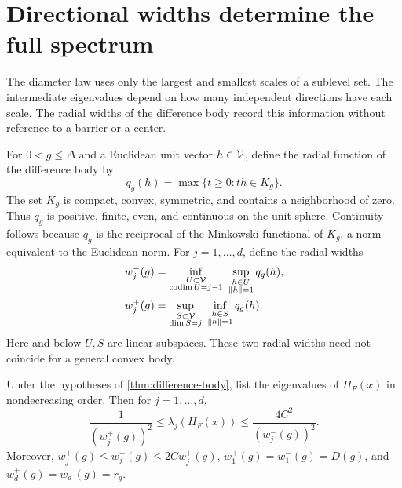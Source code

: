 \section{Directional widths determine the full spectrum}
\label{sec:widths}

The diameter law uses only the largest and smallest scales of a
sublevel set. The intermediate eigenvalues depend on how many independent
directions have each scale. The radial widths of the difference body
record this information without reference to a barrier or a center.

For $0<g\leq\Delta$ and a Euclidean unit vector $h\in\mathcal V$, define the radial function
of the difference body by
\begin{equation}
 q_g(h)=\max\{t\geq0:th\in K_g\}.
 \label{eq:radial-width}
\end{equation}
The set $K_g$ is compact, convex, symmetric, and contains a neighborhood
of zero. Thus $q_g$ is positive, finite, even, and continuous on the unit
sphere. Continuity follows because $q_g$ is the
reciprocal of the Minkowski functional of $K_g$, a norm equivalent to
the Euclidean norm. For $j=1,\ldots,d$, define
the radial widths
\begin{align}
 w_j^-(g)&=\inf_{\substack{U\subset\mathcal V\\\operatorname{codim}U=j-1}}
       \ \sup_{\substack{h\in U\\\left\lVert h\right\rVert=1}}q_g(h),
       \label{eq:radial-width-minus}\\
 w_j^+(g)&=\sup_{\substack{S\subset\mathcal V\\\dim S=j}}
       \ \inf_{\substack{h\in S\\\left\lVert h\right\rVert=1}}q_g(h).
       \label{eq:radial-width-plus}
\end{align}
Here and below $U,S$ are linear subspaces. These two radial widths
need not coincide for a general convex body.

\begin{theorem}
\label{thm:radial-spectrum}
Under the hypotheses of \cref{thm:difference-body}, list the
eigenvalues of $H_F(x)$ in
nondecreasing order. Then for $j=1,\ldots,d$,
\begin{equation}
 \frac1{(w_j^+(g))^2}\leq\lambda_j(H_F(x))
       \leq\frac{4C^2}{(w_j^-(g))^2}.
 \label{eq:radial-spectrum}
\end{equation}
Moreover, $w_j^+(g)\leq w_j^-(g)\leq2Cw_j^+(g)$,
$w_1^+(g)=w_1^-(g)=D(g)$, and
$w_d^+(g)=w_d^-(g)=r_g$.
\end{theorem}

